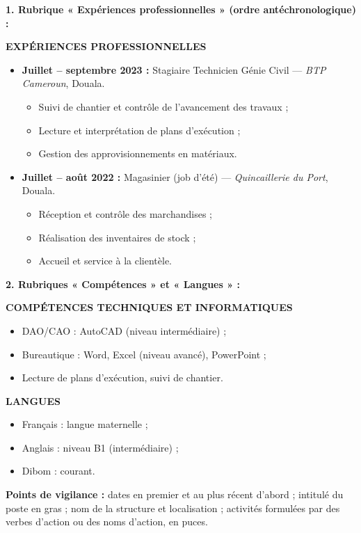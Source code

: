 \documentclass[11pt]{article}
\begin{document}
\begin{corrige}
\textbf{1. Rubrique « Expériences professionnelles » (ordre antéchronologique) :}

\textbf{EXPÉRIENCES PROFESSIONNELLES}
\begin{itemize}
\item \textbf{Juillet -- septembre 2023 :} Stagiaire Technicien Génie Civil — \emph{BTP Cameroun}, Douala.
\begin{itemize}
\item Suivi de chantier et contrôle de l'avancement des travaux ;
\item Lecture et interprétation de plans d'exécution ;
\item Gestion des approvisionnements en matériaux.
\end{itemize}
\item \textbf{Juillet -- août 2022 :} Magasinier (job d'été) — \emph{Quincaillerie du Port}, Douala.
\begin{itemize}
\item Réception et contrôle des marchandises ;
\item Réalisation des inventaires de stock ;
\item Accueil et service à la clientèle.
\end{itemize}
\end{itemize}

\textbf{2. Rubriques « Compétences » et « Langues » :}

\textbf{COMPÉTENCES TECHNIQUES ET INFORMATIQUES}
\begin{itemize}
\item DAO/CAO : AutoCAD (niveau intermédiaire) ;
\item Bureautique : Word, Excel (niveau avancé), PowerPoint ;
\item Lecture de plans d'exécution, suivi de chantier.
\end{itemize}

\textbf{LANGUES}
\begin{itemize}
\item Français : langue maternelle ;
\item Anglais : niveau B1 (intermédiaire) ;
\item Dibom : courant.
\end{itemize}

\textbf{Points de vigilance :} dates en premier et au plus récent d'abord ; intitulé du poste en gras ; nom de la structure et localisation ; activités formulées par des verbes d'action ou des noms d'action, en puces.
\end{corrige}
\end{document}
